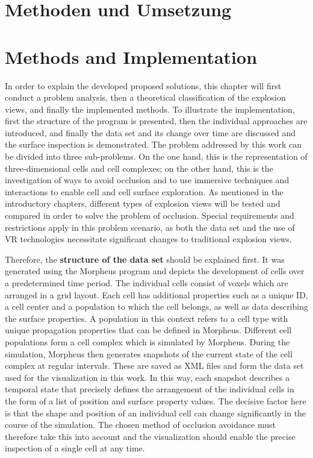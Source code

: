 {\chapter{Methoden und Umsetzung}}
{\chapter{Methods and Implementation}}
\label{sec:methods}


In order to explain the developed proposed solutions, this chapter will first conduct a problem analysis, then a theoretical classification of the explosion views, and finally the implemented methods. 
To illustrate the implementation, first the structure of the program is presented, then the individual approaches are introduced, and finally the data set and its change over time are discussed and the surface inspection is demonstrated. %
The problem addressed by this work can be divided into three sub-problems. On the one hand, this is the representation of three-dimensional cells and cell complexes; on the other hand, this is the investigation of ways to avoid occlusion and to use immersive techniques and interactions to enable cell and cell surface exploration.
As mentioned in the introductory chapters, different types of explosion views will be tested and compared in order to solve the problem of occlusion.
Special requirements and restrictions apply in this problem scenario, as both the data set and the use of VR technologies necessitate significant changes to traditional explosion views.

Therefore, the \textbf{structure of the data set} should be explained first. %
It was generated using the Morpheus program and depicts the development of cells over a predetermined time period.
The individual cells consist of voxels which are arranged in a grid layout. Each cell has additional properties such as a unique ID, a cell center and a population to which the cell belongs, as well as data describing the surface properties. 
A population in this context refers to a cell type with unique propagation properties that can be defined in Morpheus.
Different cell populations form a cell complex which is simulated by Morpheus. 
During the simulation, Morpheus then generates snapshots of the current state of the cell complex at regular intervals. 
These are saved as XML files and form the data set used for the visualization in this work. 
In this way, each snapshot describes a temporal state that precisely defines the arrangement of the individual cells in the form of a list of position and surface property values.
The decisive factor here is that the shape and position of an individual cell can change significantly in the course of the simulation. 
The chosen method of occlusion avoidance must therefore take this into account and the visualization should enable the precise inspection of a single cell at any time.

